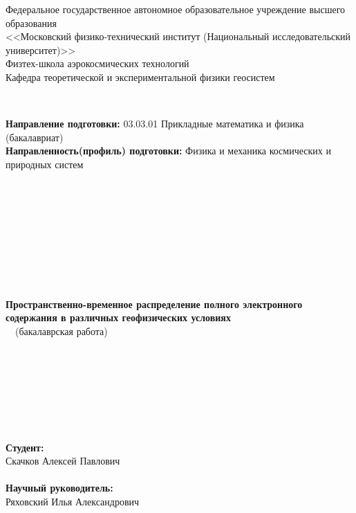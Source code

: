 \documentclass[14pt,eqno, fontsize=14pt]{article}
\begin{document}
\begin{center}
\small
Федеральное государственное автономное образовательное учреждение высшего образования\\
<<Московский физико-технический институт (Национальный исследовательский университет)>> \\
Физтех-школа аэрокосмических технологий\\
Кафедра теоретической и экспериментальной физики геосистем
\end{center}
~\
\begin{flushleft}
\small
\textbf{Направление подготовки:} 03.03.01 Прикладные математика и физика (бакалавриат)\\
\textbf{Направленность(профиль) подготовки:} Физика и механика космических и природных систем\\
\end{flushleft}
~\
~\

~\
~\
~\
~\
~\

~\
~\
~\

~\

~\
~\
\begin{center}
\LARGE
\textbf{Пространственно-временное распределение полного электронного содержания в различных геофизических условиях}\\
~\
\small(бакалаврская работа)
\end{center}

~\

~\

~\

~\

\begin{flushleft}

\hspace{300pt} \textbf{Студент:}\\
\hspace{300pt} Скачков Алексей Павлович\\
\hspace{300pt} \underline{\hspace{3cm}}\\
\hspace{300pt} \textbf{Научный руководитель:}\\
\hspace{300pt} Ряховский Илья Александрович\\
\hspace{300pt} \underline{\hspace{3cm}}\\

\end{flushleft}
\end{document}
